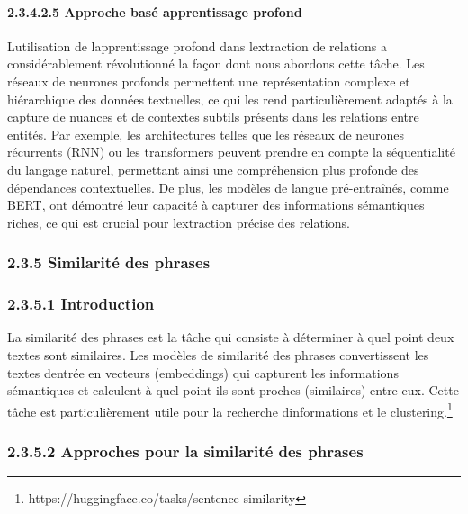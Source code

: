 \documentclass[
]{article}
\begin{document}
\paragraph{2.3.4.2.5 Approche basé apprentissage
profond}\label{approche-basuxe9-apprentissage-profond}

L\textquotesingle utilisation de l\textquotesingle apprentissage profond
dans l\textquotesingle extraction de relations a considérablement
révolutionné la façon dont nous abordons cette tâche. Les réseaux de
neurones profonds permettent une représentation complexe et hiérarchique
des données textuelles, ce qui les rend particulièrement adaptés à la
capture de nuances et de contextes subtils présents dans les relations
entre entités. Par exemple, les architectures telles que les réseaux de
neurones récurrents (RNN) ou les transformers peuvent prendre en compte
la séquentialité du langage naturel, permettant ainsi une compréhension
plus profonde des dépendances contextuelles. De plus, les modèles de
langue pré-entraînés, comme BERT, ont démontré leur capacité à capturer
des informations sémantiques riches, ce qui est crucial pour
l\textquotesingle extraction précise des relations.

\subsubsection{2.3.5 Similarité des
phrases}\label{similarituxe9-des-phrases}

\subsubsection{2.3.5.1 Introduction}\label{introduction-7}

La similarité des phrases est la tâche qui consiste à déterminer à quel
point deux textes sont similaires. Les modèles de similarité des phrases
convertissent les textes d\textquotesingle entrée en vecteurs
(embeddings) qui capturent les informations sémantiques et calculent à
quel point ils sont proches (similaires) entre eux. Cette tâche est
particulièrement utile pour la recherche d\textquotesingle informations
et le clustering.\footnote{https://huggingface.co/tasks/sentence-similarity}

\subsubsection{2.3.5.2 Approches pour la similarité des
phrases}\label{approches-pour-la-similarituxe9-des-phrases}
\end{document}
